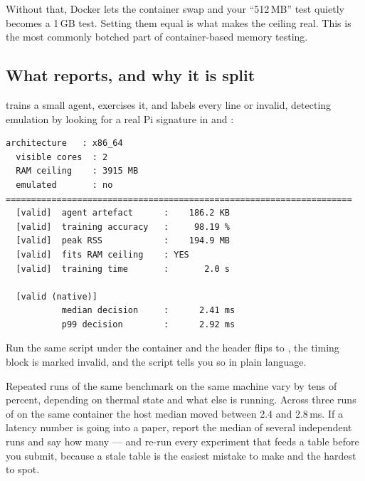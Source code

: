 \begin{keybox}
Without that, Docker lets the container swap and your ``512\,MB'' test quietly
becomes a 1\,GB test. Setting them equal is what makes the ceiling real. This is
the most commonly botched part of container-based memory testing.
\end{keybox}

\subsection{What  reports, and why it is split}

 trains a small agent, exercises it, and labels every
line \code{[valid]} or invalid, detecting emulation by looking for a real Pi
signature in  and :

\begin{codebox}
\begin{lstlisting}[style=out]
  architecture   : x86_64
  visible cores  : 2
  RAM ceiling    : 3915 MB
  emulated       : no
====================================================================
  [valid]  agent artefact      :    186.2 KB
  [valid]  training accuracy   :     98.19 %
  [valid]  peak RSS            :    194.9 MB
  [valid]  fits RAM ceiling    : YES
  [valid]  training time       :       2.0 s

  [valid (native)]
           median decision     :      2.41 ms
           p99 decision        :      2.92 ms
\end{lstlisting}
\end{codebox}

\noindent Run the same script under the  container and the header
flips to , the timing block is marked invalid, and the
script tells you so in plain language.

\begin{warnbox}
Repeated runs of the same benchmark on the same machine vary by tens of
percent, depending on thermal state and what else is running. Across three runs
of  on the same container the host median moved between
2.4 and 2.8\,ms. If a latency number is going into a paper, report the median
of several independent runs and say how many --- and re-run every experiment
that feeds a table before you submit, because a stale table is the easiest
mistake to make and the hardest to spot.
\end{warnbox}


